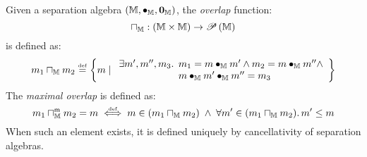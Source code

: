 \begin{definition}[Overlap]
Given a separation algebra $\left(\mathbb{M}, \bullet_{\mathbb{M}}, \mathbf{0}_{\mathbb{M}} \right)$, the \emph{overlap} function:
%
\[
\sqcap_{\mathbb{M}} : \left(\mathbb{M} \times \mathbb{M} \right)\rightarrow \mathscr{P}\left(\mathbb{M} \right)
\]
%
is defined as:
%
\[
	m_1 \meet{\mathbb{M}} m_2 \eqdef 
	\left\{ m \mid 
					\begin{array}{l @{\hspace{3pt}} l}
						\exsts{m', m'', m_3} & m_1 = m \compose{\mathbb{M}} m' \land m_2 = m \compose{\mathbb{M}} m'' \land\\
						&m \compose{\mathbb{M}} m' \compose{\mathbb{M}} m'' = m_3 					
					\end{array}
					\right\}
\]
%
The \emph{maximal overlap} is defined as:
%
\[
	m_1 \sqcap_{\mathbb{M}}^{\textsf{m}} m_2 = m \mathrel{\stackrel{\smash{\scriptscriptstyle{\mathrm{def}}}}{\iff}} m \in (m_1 \sqcap_{\mathbb{M}} m_2) \;\land\; \forall m' \in (m_1 \sqcap_{\mathbb{M}} m_2).\, m' \leq m
\]
%
When such an element exists, it is defined uniquely by cancellativity of separation algebras.
\end{definition}
%
%

%
%
